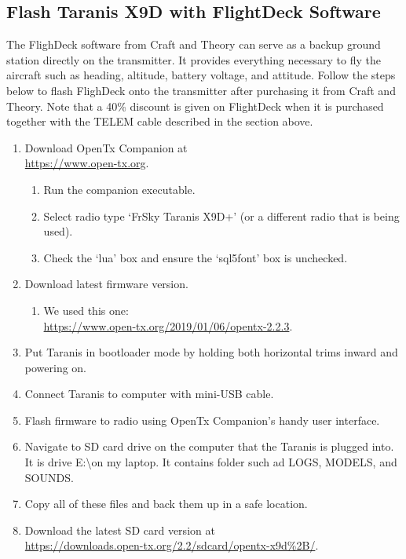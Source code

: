 \documentclass[12pt,journal,compsoc]{IEEEtran}
\begin{document}
\subsection{Flash Taranis X9D with FlightDeck Software}
The FlighDeck software from Craft and Theory can serve as a backup ground station directly on the transmitter. It provides everything necessary to fly the aircraft such as heading, altitude, battery voltage, and attitude. Follow the steps below to flash FlighDeck onto the transmitter after purchasing it from Craft and Theory. Note that a 40\% discount is given on FlightDeck when it is purchased together with the TELEM cable described in the section above.
\begin{enumerate}
\item Download OpenTx Companion at\\ \href{https://www.open-tx.org}{https://www.open-tx.org}.
\begin{enumerate}
\item Run the companion executable.
\item Select radio type `FrSky Taranis X9D+' (or a different radio that is being used).
\item Check the `lua' box and ensure the `sql5font' box is unchecked.
\end{enumerate}
\item Download latest firmware version.
\begin{enumerate}
\item We used this one:\\ \href{https://www.open-tx.org/2019/01/06/opentx-2.2.3}{https://www.open-tx.org/2019/01/06/opentx-2.2.3}.
\end{enumerate}
\item Put Taranis in bootloader mode by holding both horizontal trims inward and powering on.
\item Connect Taranis to computer with mini-USB cable.
\item Flash firmware to radio using OpenTx Companion's handy user interface.
\item Navigate to SD card drive on the computer that the Taranis is plugged into. It is drive E:\textbackslash on my laptop. It contains folder such ad LOGS, MODELS, and SOUNDS.
\item Copy all of these files and back them up in a safe location.
\item Download the latest SD card version at\\ \href{https://downloads.open-tx.org/2.2/sdcard/opentx-x9d%2B/}{https://downloads.open-tx.org/2.2/sdcard/opentx-x9d\%2B/}. %

\end{enumerate}
\end{document}
